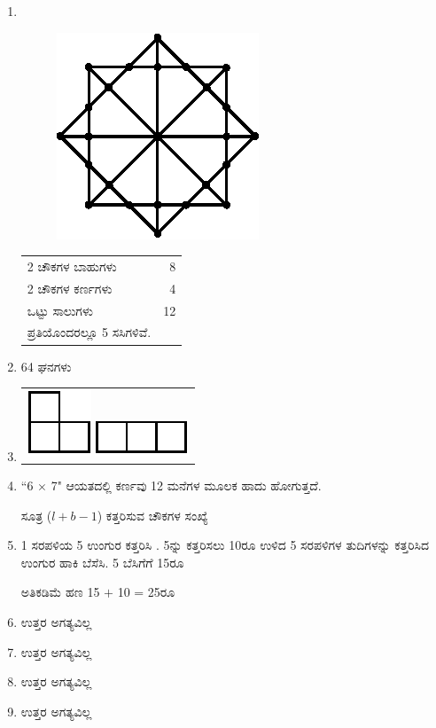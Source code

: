 \begin{enumerate}
\smallskip
\item 
~

\noindent
\begin{minipage}[c]{4cm}
\begin{figure}[H]
\centering
\includegraphics[scale=.85]{images/chap1/ans22.eps}
\end{figure}
\end{minipage}
\begin{minipage}[c]{5cm}
\begin{tabular}{lr}
2 ಚೌಕಗಳ ಬಾಹುಗಳು & 8\\
2 ಚೌಕಗಳ ಕರ್ಣಗಳು & 4\\
\hline
ಒಟ್ಟು ಸಾಲುಗಳು & 12\\
\hline
ಪ್ರತಿಯೊಂದರಲ್ಲೂ 5 ಸಸಿಗಳಿವೆ. &
\end{tabular}
\end{minipage}




\item 64 ಘನಗಳು 

\item 
\begin{tabular}[c]{c}
\includegraphics{images/chap1/ans24a.eps}\quad \raisebox{.3cm}{ಅಥವಾ} \quad \includegraphics{images/chap1/ans24b.eps}
\end{tabular}

\item “6 $\times$ 7" ಆಯತದಲ್ಲಿ ಕರ್ಣವು 12 ಮನೆಗಳ ಮೂಲಕ ಹಾದು ಹೋಗುತ್ತದೆ.

ಸೂತ್ರ ($l + b - 1$) ಕತ್ತರಿಸುವ ಚೌಕಗಳ ಸಂಖ್ಯೆ 

\item 1 ಸರಪಳಿಯ 5 ಉಂಗುರ ಕತ್ತರಿಸಿ . 5ನ್ನು ಕತ್ತರಿಸಲು 10ರೂ ಉಳಿದ 5 ಸರಪಳಿಗಳ ತುದಿಗಳನ್ನು ಕತ್ತರಿಸಿದ ಉಂಗುರ ಹಾಕಿ ಬೆಸೆಸಿ. 5 ಬೆಸಿಗೆಗೆ 15ರೂ 

ಅತಿಕಡಿಮೆ ಹಣ 15 $+$ 10 = 25ರೂ 

\item ಉತ್ತರ ಅಗತ್ಯವಿಲ್ಲ 

\item ಉತ್ತರ ಅಗತ್ಯವಿಲ್ಲ 

\item ಉತ್ತರ ಅಗತ್ಯವಿಲ್ಲ 

\item ಉತ್ತರ ಅಗತ್ಯವಿಲ್ಲ 
\end{enumerate}
